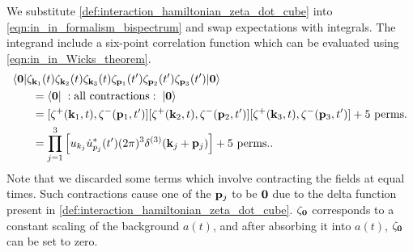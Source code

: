 We substitute \eqref{def:interaction_hamiltonian_zeta_dot_cube} into \eqref{eqn:in_in_formalism_bispectrum} and swap expectations with integrals. The integrand include a six-point correlation function which can be evaluated using \eqref{eqn:in_in_Wicks_theorem}.
\begin{align}
	&\langle\vv{0}| \zeta_{\vv{k}_1}(t) \zeta_{\vv{k}_2}(t) \zeta_{\vv{k}_3}(t) \zeta_{\vv{p}_1}(t') \zeta_{\vv{p}_2}(t') \zeta_{\vv{p}_3}(t') |\vv{0}\rangle \nonumber\\
	&\hspace{0.05\textwidth}= \langle\vv{0}| \;: \text{all contractions} :\;|\vv{0}\rangle \\
	&\hspace{0.05\textwidth}= [ \zeta^+(\vv{k}_1,t) , \zeta^-(\vv{p}_1,t') ] [ \zeta^+(\vv{k}_2,t) , \zeta^-(\vv{p}_2,t') ] [ \zeta^+(\vv{k}_3,t) , \zeta^-(\vv{p}_3,t') ] + \text{5 perms.}  \\
	&\hspace{0.05\textwidth}=  \prod_{j=1}^{3} \left[ u_{k_j} \dot{u}^*_{p_j}(t') (2\pi)^3 \delta^{(3)}(\vv{k}_j+\vv{p}_j) \right] + \text{5 perms.}.
\end{align}
Note that we discarded some terms which involve contracting the fields at equal times. Such contractions cause one of the $\mathbf{p}_j$ to be $\mathbf{0}$ due to the delta function present in \eqref{def:interaction_hamiltonian_zeta_dot_cube}. $\zeta_\mathbf{0}$ corresponds to a constant scaling of the background $a(t)$, and after absorbing it into $a(t)$, $\zeta_{\mathbf{0}}$ can be set to zero. 

